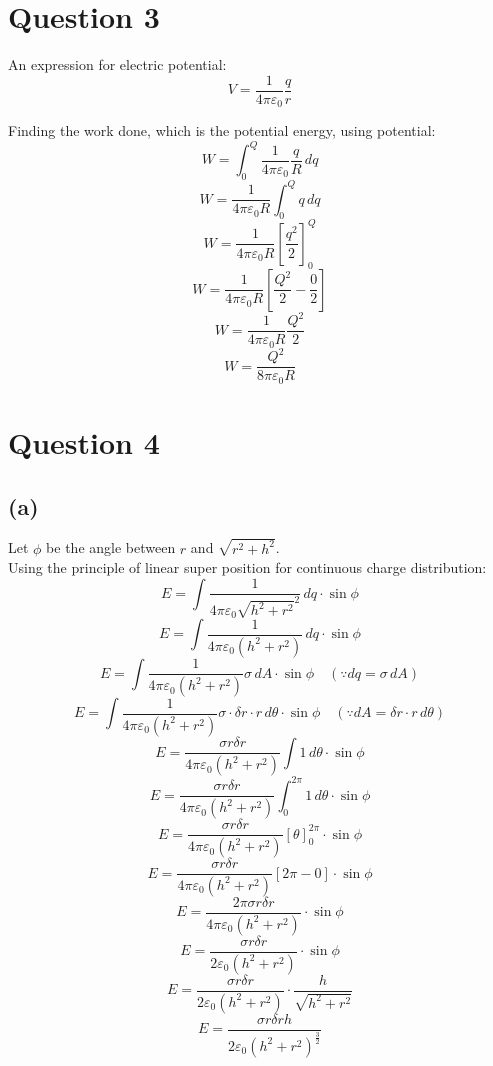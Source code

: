 \documentclass[11pt]{article}
\begin{document}
\newpage

\section{Question 3}
\label{sec:orgb09afec}
An expression for electric potential:
\[V = \frac{1}{4 \pi \varepsilon_0} \frac{q}{r}\]

Finding the work done, which is the potential energy, using potential:
\[W = \int_0^Q \frac{1}{4 \pi \varepsilon_0} \frac{q}{R} \, dq\]
\[W = \frac{1}{4 \pi \varepsilon_0 R} \int_0^Q q \, dq\]
\[W = \frac{1}{4 \pi \varepsilon_0 R} \left[\frac{q^2}{2} \right]_0^Q\]
\[W = \frac{1}{4 \pi \varepsilon_0 R} \left[\frac{Q^2}{2} - \frac{0}{2} \right]\]
\[W = \frac{1}{4 \pi \varepsilon_0 R} \frac{Q^2}{2}\]
\[W = \frac{Q^2}{8 \pi \varepsilon_0 R}\]

\newpage

\section{Question 4}
\label{sec:orgb1f1a60}

\subsection{(a)}
\label{sec:org5418a99}
Let \(\phi\) be the angle between \(r\) and \(\sqrt{r^2 + h^2}\).
\\[0pt]

Using the principle of linear super position for continuous charge distribution:
\[E = \int \frac{1}{4 \pi \varepsilon_0 \sqrt{h^2 + r^2}^2} \, dq \cdot \sin \phi\]
\[E = \int \frac{1}{4 \pi \varepsilon_0 (h^2 + r^2)} \, dq \cdot \sin \phi\]
\[E = \int \frac{1}{4 \pi \varepsilon_0 (h^2 + r^2)} \sigma \, dA \cdot \sin \phi \quad (\because dq = \sigma \, dA)\]
\[E = \int \frac{1}{4 \pi \varepsilon_0 (h^2 + r^2)} \sigma \cdot \delta r \cdot r \, d \theta \cdot \sin \phi \quad (\because dA = \delta r \cdot r \, d \theta)\]
\[E = \frac{\sigma r \delta r}{4 \pi \varepsilon_0 (h^2 + r^2)} \int 1 \, d \theta \cdot \sin \phi\]
\[E = \frac{\sigma r \delta r}{4 \pi \varepsilon_0 (h^2 + r^2)} \int_0^{2\pi} 1 \, d \theta \cdot \sin \phi\]
\[E = \frac{\sigma r \delta r}{4 \pi \varepsilon_0 (h^2 + r^2)} [\theta]_0^{2\pi} \cdot \sin \phi\]
\[E = \frac{\sigma r \delta r}{4 \pi \varepsilon_0 (h^2 + r^2)} [2 \pi - 0] \cdot \sin \phi\]
\[E = \frac{2 \pi \sigma r \delta r}{4 \pi \varepsilon_0 (h^2 + r^2)} \cdot \sin \phi\]
\[E = \frac{\sigma r \delta r}{2 \varepsilon_0 (h^2 + r^2)} \cdot \sin \phi\]
\[E = \frac{\sigma r \delta r}{2 \varepsilon_0 (h^2 + r^2)} \cdot \frac{h}{\sqrt{h^2 + r^2}}\]
\[E = \frac{\sigma r \delta r h}{2 \varepsilon_0 (h^2 + r^2)^{\frac{3}{2}}}\]
\end{document}
